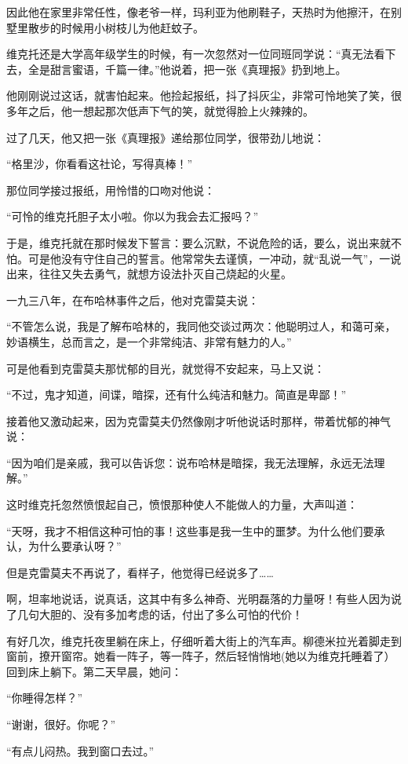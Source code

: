 因此他在家里非常任性，像老爷一样，玛利亚为他刷鞋子，天热时为他擦汗，在别墅里散步的时候用小树枝儿为他赶蚊子。

维克托还是大学高年级学生的时候，有一次忽然对一位同班同学说：“真无法看下去，全是甜言蜜语，千篇一律。”他说着，把一张《真理报》扔到地上。

他刚刚说过这话，就害怕起来。他捡起报纸，抖了抖灰尘，非常可怜地笑了笑，很多年之后，他一想起那次低声下气的笑，就觉得脸上火辣辣的。

过了几天，他又把一张《真理报》递给那位同学，很带劲儿地说：

“格里沙，你看看这社论，写得真棒！”

那位同学接过报纸，用怜惜的口吻对他说：

“可怜的维克托胆子太小啦。你以为我会去汇报吗？”

于是，维克托就在那时候发下誓言：要么沉默，不说危险的话，要么，说出来就不怕。可是他没有守住自己的誓言。他常常失去谨慎，一冲动，就“乱说一气”，一说出来，往往又失去勇气，就想方设法扑灭自己烧起的火星。

一九三八年，在布哈林事件之后，他对克雷莫夫说：

“不管怎么说，我是了解布哈林的，我同他交谈过两次：他聪明过人，和蔼可亲，妙语横生，总而言之，是一个非常纯洁、非常有魅力的人。”

可是他看到克雷莫夫那忧郁的目光，就觉得不安起来，马上又说：

“不过，鬼才知道，间谍，暗探，还有什么纯洁和魅力。简直是卑鄙！”

接着他又激动起来，因为克雷莫夫仍然像刚才听他说话时那样，带着忧郁的神气说：

“因为咱们是亲戚，我可以告诉您：说布哈林是暗探，我无法理解，永远无法理解。”

这时维克托忽然愤恨起自己，愤恨那种使人不能做人的力量，大声叫道：

“天呀，我才不相信这种可怕的事！这些事是我一生中的噩梦。为什么他们要承认，为什么要承认呀？”

但是克雷莫夫不再说了，看样子，他觉得已经说多了……

啊，坦率地说话，说真话，这其中有多么神奇、光明磊落的力量呀！有些人因为说了几句大胆的、没有多加考虑的话，付出了多么可怕的代价！

有好几次，维克托夜里躺在床上，仔细听着大街上的汽车声。柳德米拉光着脚走到窗前，撩开窗帘。她看一阵子，等一阵子，然后轻悄悄地(她以为维克托睡着了）回到床上躺下。第二天早晨，她问：

“你睡得怎样？”

“谢谢，很好。你呢？”

“有点儿闷热。我到窗口去过。”

